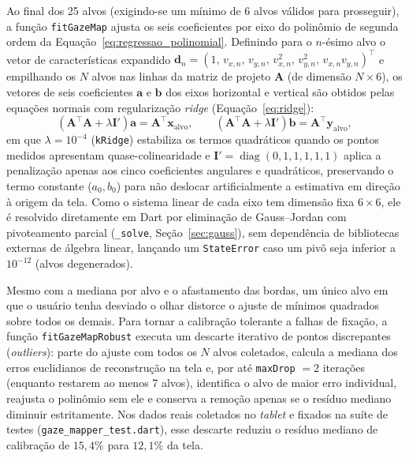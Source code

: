 Ao final dos 25 alvos (exigindo-se um mínimo de 6 alvos válidos para prosseguir), a função \texttt{fitGazeMap} ajusta os seis coeficientes por eixo do polinômio de segunda ordem da Equação~\ref{eq:regressao_polinomial}. Definindo para o $n$-ésimo alvo o vetor de características expandido $\mathbf{d}_n = (1,\, v_{x,n},\, v_{y,n},\, v_{x,n}^2,\, v_{y,n}^2,\, v_{x,n}v_{y,n})^\top$ e empilhando os $N$ alvos nas linhas da matriz de projeto $\mathbf{A}$ (de dimensão $N \times 6$), os vetores de seis coeficientes $\mathbf{a}$ e $\mathbf{b}$ dos eixos horizontal e vertical são obtidos pelas equações normais com regularização \textit{ridge} (Equação~\ref{eq:ridge}):
\begin{equation}
    \left(\mathbf{A}^\top \mathbf{A} + \lambda \mathbf{I}'\right)\mathbf{a} = \mathbf{A}^\top \mathbf{x}_{\text{alvo}}, \qquad
    \left(\mathbf{A}^\top \mathbf{A} + \lambda \mathbf{I}'\right)\mathbf{b} = \mathbf{A}^\top \mathbf{y}_{\text{alvo}},
    \label{eq:equacoes_normais_ridge}
\end{equation}
em que $\lambda = 10^{-4}$ (\texttt{kRidge}) estabiliza os termos quadráticos quando os pontos medidos apresentam quase-colinearidade e $\mathbf{I}' = \operatorname{diag}(0, 1, 1, 1, 1, 1)$ aplica a penalização apenas aos cinco coeficientes angulares e quadráticos, preservando o termo constante ($a_0, b_0$) para não deslocar artificialmente a estimativa em direção à origem da tela. Como o sistema linear de cada eixo tem dimensão fixa $6 \times 6$, ele é resolvido diretamente em Dart por eliminação de Gauss--Jordan com pivoteamento parcial (\texttt{\_solve}, Seção~\ref{sec:gauss}), sem dependência de bibliotecas externas de álgebra linear, lançando um \texttt{StateError} caso um pivô seja inferior a $10^{-12}$ (alvos degenerados).

Mesmo com a mediana por alvo e o afastamento das bordas, um único alvo em que o usuário tenha desviado o olhar distorce o ajuste de mínimos quadrados sobre todos os demais. Para tornar a calibração tolerante a falhas de fixação, a função \texttt{fitGazeMapRobust} executa um descarte iterativo de pontos discrepantes (\textit{outliers}): parte do ajuste com todos os $N$ alvos coletados, calcula a mediana dos erros euclidianos de reconstrução na tela e, por até \texttt{maxDrop} $= 2$ iterações (enquanto restarem ao menos 7 alvos), identifica o alvo de maior erro individual, reajusta o polinômio sem ele e conserva a remoção apenas se o resíduo mediano diminuir estritamente. Nos dados reais coletados no \textit{tablet} e fixados na suíte de testes (\texttt{gaze\_mapper\_test.dart}), esse descarte reduziu o resíduo mediano de calibração de $15{,}4\%$ para $12{,}1\%$ da tela.

